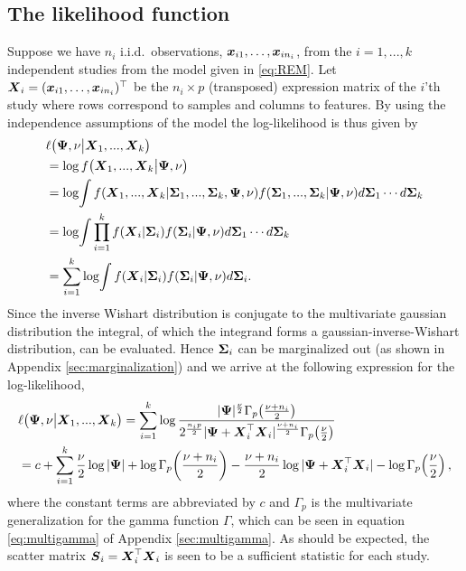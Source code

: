 \documentclass{article}\usepackage[]{graphicx}\usepackage[]{color}
\begin{document}
\subsection{The likelihood function}
Suppose we have $n_i$ i.i.d.\ observations, ${\boldsymbol{x}}_{i1}, \dots,{\boldsymbol{x}}_{in_i}$, from the $i = 1,...,k$ independent studies from the model given in \eqref{eq:REM}.
Let ${\boldsymbol{X}}_i = ({\boldsymbol{x}}_{i1}, \dots,{\boldsymbol{x}}_{in_i})^\top$ be the $n_i \times p$ (transposed) expression matrix of the $i$'th study where rows correspond to samples and columns to features. By using the independence assumptions of the model the log-likelihood is thus given by
\begin{align*}
  &\ell\!\left(\vPsi, \nu \big|\vX_1, ..., \vX_k  \right) \\
  &= \log f\!\left(\vX_1, ..., \vX_k \big| \vPsi, \nu \right) \\
  &= \log\!\int %
               f(\vX_1, ...,\vX_k |
               \vSigma_1, ..., \vSigma_k, \vPsi, \nu)
             f(\vSigma_1, ..., \vSigma_k | \vPsi, \nu)
             d\vSigma_1 \cdots d\vSigma_k \\
  &= \log\!\int %
               \prod_{i=1}^k
               f(\vX_i | \vSigma_i)
               f(\vSigma_i | \vPsi, \nu)
               d\vSigma_1 \cdots d\vSigma_k \\
  &= \sum_{i=1}^k \log\!\int
               f(\vX_i | \vSigma_i)
               f(\vSigma_i | \vPsi, \nu)
               d\vSigma_i.
\end{align*}
Since the inverse Wishart distribution is conjugate to the multivariate gaussian distribution the integral, of which the integrand forms a gaussian-inverse-Wishart distribution, can be evaluated. Hence ${\boldsymbol{\Sigma}}_i$ can be marginalized out (as shown in Appendix \ref{sec:marginalization}) and we arrive at the following expression for the log-likelihood,
\small
\begin{align}
  &\ell\!\left(\vPsi, \nu \big| \vX_1, ..., \vX_k \right) %
  = \sum_{i=1}^k \log
    \frac{|\vPsi|^\frac{\nu}{2} \Gamma_p\!\left(\frac{\nu+n_i}{2}\right)}
         {2^\frac{n_i p}{2} |\vPsi +\vX_i^\top\vX_i|^\frac{\nu+n_i}{2}
          \Gamma_p\!\left(\frac{\nu}{2}\right)}          \notag\\
  &= c + \sum_{i=1}^k
            \frac{\nu}{2}  \log |\vPsi|
            + \log \Gamma_p\!\left(\frac{\nu + n_i}{2}\right)
            - \frac{\nu + n_i}{2}\log|\vPsi +\vX_i^\top\vX_i|
            - \log \Gamma_p\!\left(\frac{\nu}{2}\right),
    \label{eq:loglik}
\end{align}
\normalsize
where the constant terms are abbreviated by $c$ and $\Gamma_p$ is the multivariate generalization for the gamma function $\Gamma$, which can be seen in equation \eqref{eq:multigamma} of Appendix \ref{sec:multigamma}. As should be expected, the scatter matrix $\boldsymbol{S}_i ={\boldsymbol{X}}_i^\top{\boldsymbol{X}}_i$ is seen to be a sufficient statistic for each study.
\end{document}
